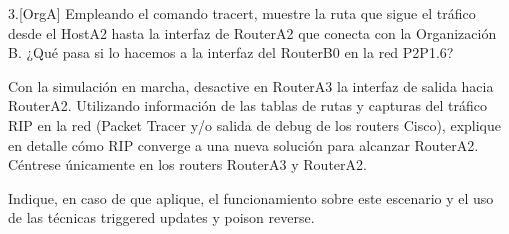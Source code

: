 \begin{ejer}
3.[OrgA] Empleando el comando tracert, muestre la ruta que sigue el tráfico desde el HostA2 hasta la interfaz de RouterA2 que conecta con la Organización B. ¿Qué pasa si lo hacemos a la interfaz del RouterB0 en la red P2P1.6?
\par Con la simulación en marcha, desactive en RouterA3 la interfaz de salida hacia RouterA2. Utilizando información de las tablas de rutas y capturas del tráfico RIP en la red (Packet Tracer y/o salida de debug de los routers Cisco), explique en detalle cómo RIP converge a una nueva solución para alcanzar RouterA2. Céntrese únicamente en los routers RouterA3 y RouterA2.
\par Indique, en caso de que aplique, el funcionamiento sobre este escenario y el uso de las técnicas triggered updates y poison reverse.
\end{ejer}